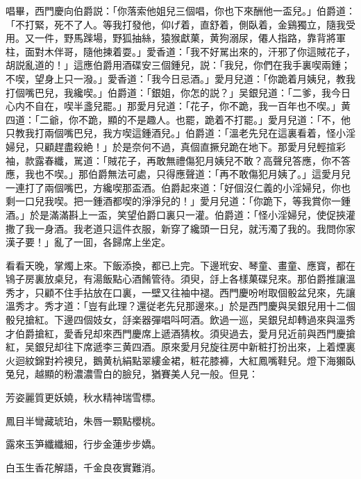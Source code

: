 唱畢，西門慶向伯爵説：「你落索他姐兒三個唱，你也下來酬他一盃兒。」伯爵道：「不打緊，死不了人。等我打發他，仰げ着，直舒着，側臥着，金鷄獨立，隨我受用。又一件，野馬䠕場，野狐抽絲，猿猴獻菓，黄狗溺尿，僊人指路，靠背將軍柱，面對木伴哥，隨他揀着耍。」愛香道：「我不好駡出來的，汗邪了你這賊花子，胡説亂道的！」這應伯爵用酒碟安三個鍾兒，説：「我兒，你們在我手裏喫兩鍾；不喫，望身上只一潑。」愛香道：「我今日忌酒。」愛月兒道：「你跪着月姨兒，教我打個嘴巴兒，我纔喫。」伯爵道：「銀姐，你怎的説？」吴銀兒道：「二爹，我今日心内不自在，喫半盞兒罷。」那愛月兒道：「花子，你不跪，我一百年也不喫。」黄四道：「二爺，你不跪，顯的不是趣人。也罷，跪着不打罷。」愛月兒道：「不，他只教我打兩個嘴巴兒，我方喫這鍾酒兒。」伯爵道：「溫老先兒在這裏看着，怪小淫婦兒，只顧趕盡殺絶！」於是奈何不過，真個直撅兒跪在地下。那愛月兒輕揎彩袖，款露春纖，駡道：「賊花子，再敢無禮傷犯月姨兒不敢？高聲兒答應，你不答應，我也不喫。」那伯爵無法可處，只得應聲道：「再不敢傷犯月姨了。」這愛月兒一連打了兩個嘴巴，方纔喫那盃酒。伯爵起來道：「好個沒仁義的小淫婦兒，你也剩一口兒我喫。把一鍾酒都喫的淨淨兒的！」愛月兒道：「你跪下，等我賞你一鍾酒。」於是滿滿斟上一盃，笑望伯爵口裏只一灌。伯爵道：「怪小淫婦兒，使促挾灌撒了我一身酒。我老道只這件衣服，新穿了纔頭一日兒，就汚濁了我的。我問你家漢子要！」亂了一囬，各歸席上坐定。

看看天晚，掌燭上來。下飯添換，都已上完。下邊玳安、琴童、畫童、應寳，都在鴇子房裏放桌兒，有湯飯點心酒餚管待。須臾，㧱上各樣菓碟兒來。那伯爵推讓溫秀才，只顧不住手拈放在口裏，一壁又往袖中褪。西門慶吩咐取個骰盆兒來，先讓溫秀才。秀才道：「豈有此理？還従老先兒那邊來。」於是西門慶與吴銀兒用十二個骰兒搶紅。下邊四個妓女，㧱楽器彈唱呌呵酒。飲過一巡，吴銀兒却轉過來與溫秀才伯爵搶紅，愛香兒却來西門慶席上遞酒猜枚。須臾過去，愛月兒近前與西門慶搶紅，吴銀兒却往下席遞李三黄四酒。原來愛月兒旋往房中新粧打扮出來，上着煙裏火迴紋錦對衿襖兒，鵝黄杭絹點翠縷金裙，粧花膝褲，大紅鳳嘴鞋兒。燈下海獺臥兔兒，越顯的粉濃濃雪白的臉兒，猶賽美人兒一般。但見：

芳姿麗質更妖嬈，秋水精神瑞雪標。

鳳目半彎藏琥珀，朱唇一顆點櫻桃。

露來玉笋纖纖細，行步金蓮步步嬌。

白玉生香花解語，千金良夜實難消。

